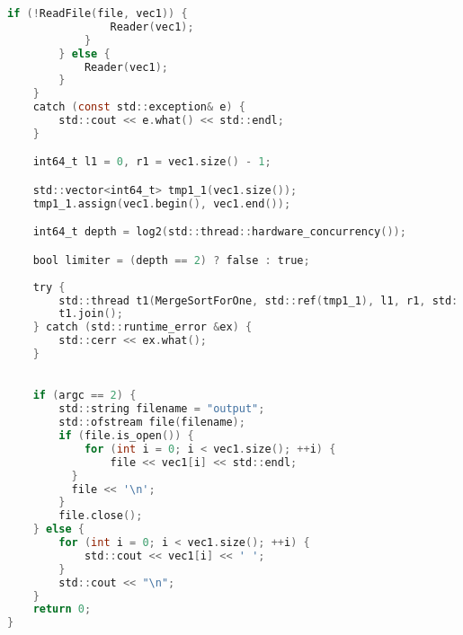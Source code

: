 \begin{lstlisting}[language=C]
            if (!ReadFile(file, vec1)) {
                Reader(vec1);
            }
        } else {
            Reader(vec1);
        }
    }
    catch (const std::exception& e) {
        std::cout << e.what() << std::endl;
    }

    int64_t l1 = 0, r1 = vec1.size() - 1;

    std::vector<int64_t> tmp1_1(vec1.size());
    tmp1_1.assign(vec1.begin(), vec1.end());

    int64_t depth = log2(std::thread::hardware_concurrency());

    bool limiter = (depth == 2) ? false : true;
    
    try {
        std::thread t1(MergeSortForOne, std::ref(tmp1_1), l1, r1, std::ref(vec1), depth, limiter);
        t1.join();
    } catch (std::runtime_error &ex) {
        std::cerr << ex.what();
    }
    

    if (argc == 2) {
        std::string filename = "output";
        std::ofstream file(filename);
        if (file.is_open()) {
            for (int i = 0; i < vec1.size(); ++i) {
                file << vec1[i] << std::endl;
          }
          file << '\n';
        }
        file.close();
    } else {
        for (int i = 0; i < vec1.size(); ++i) {
            std::cout << vec1[i] << ' ';
        }
        std::cout << "\n";
    }
    return 0;
}
\end{lstlisting}

\pagebreak
